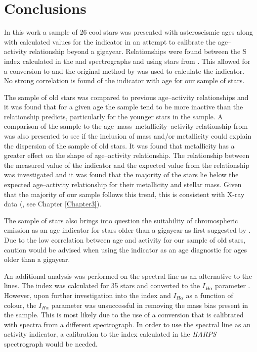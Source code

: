 \section{Conclusions}
In this work a sample of 26 cool stars was presented with asteroseismic ages along with calculated values for the \Rprime indicator in an attempt to calibrate the age--activity relationship beyond a gigayear. Relationships were found between the S index calculated in the \narval and \esp spectrographs and \Smw using stars from \citet{Duncan_etal_1991}. This allowed for a conversion to \Smw and the original method by \citet{Noyes_etal_1984} was used to calculate the \Rprime indicator. No strong correlation is found of the \Rprime indicator with age for our sample of stars.

The sample of old stars was compared to previous age--activity relationships and it was found that for a given age the sample tend to be more inactive than the relationship predicts, particularly for the younger stars in the sample. A comparison of the sample to the age--mass--metallicity--activity relationship from \citet{Lorenzo_Oliveira_etal_2016} was also presented to see if the inclusion of mass and/or metallicity could explain the dispersion of the sample of old stars. It was found that metallicity has a greater effect on the shape of age--activity relationship. The relationship between the measured value of the \Rprime indicator and the expected value from the \citet{Lorenzo_Oliveira_etal_2016} relationship was investigated and it was found that the majority of the stars lie below the expected age--activity relationship for their metallicity and stellar mass. Given that the majority of our sample follows this trend, this is consistent with X-ray data (\citealt{Booth_etal_2017}, see Chapter \ref{Chapter3}).

The sample of stars also brings into question the suitability of chromospheric emission as an age indicator for stars older than a gigayear as first suggested by \citet{Pace_2013}. Due to the low correlation between age and activity for our sample of old stars, caution would be advised when using the \Rprime indicator as an age diagnostic for ages older than a gigayear.

An additional analysis was performed on the \Halpha spectral line as an alternative to the \caII lines. The \Halpha index was calculated for 35 stars and converted to the $I_{H\alpha}$ parameter \citep{Gomes_da_Silva_etal_2014}. However, upon further investigation into the \Halpha index and $I_{H\alpha}$ as a function of colour, the $I_{H\alpha}$ parameter was unsuccessful in removing the mass bias present in the sample. This is most likely due to the use of a conversion that is calibrated with spectra from a different spectrograph. In order to use the \Halpha spectral line as an activity indicator, a calibration to the \Halpha index calculated in the \textit{HARPS} spectrograph would be needed.


